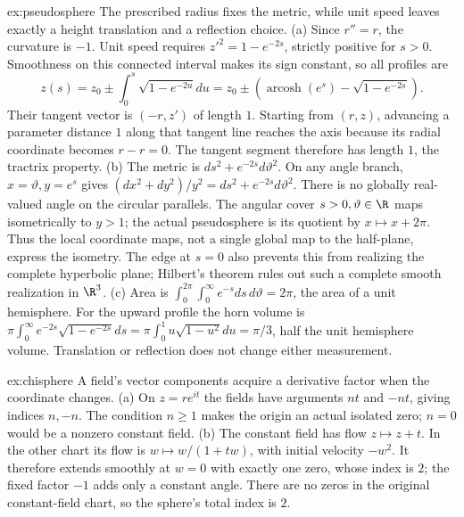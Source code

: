 \begin{solution}{ex:pseudosphere}
\idea The prescribed radius fixes the metric, while unit speed leaves exactly a height translation and a reflection choice.
\writeup (a) Since $r''=r$, the curvature is $-1$. Unit speed requires $z'^2=1-e^{-2s}$, strictly positive for $s>0$. Smoothness on this connected interval makes its sign constant, so all profiles are
\[
z(s)=z_0\pm\int_0^s\sqrt{1-e^{-2u}}du
=z_0\pm\left(\operatorname{arcosh}(e^s)-\sqrt{1-e^{-2s}}\right).
\]
Their tangent vector is $(-r,z')$ of length $1$. Starting from $(r,z)$, advancing a parameter distance $1$ along that tangent line reaches the axis because its radial coordinate becomes $r-r=0$. The tangent segment therefore has length $1$, the tractrix property.
(b) The metric is $ds^2+e^{-2s}d\vartheta^2$. On any angle branch, $x=\vartheta,y=e^s$ gives $(dx^2+dy^2)/y^2=ds^2+e^{-2s}d\vartheta^2$. There is no globally real-valued angle on the circular parallels. The angular cover $s>0,\vartheta\in\R$ maps isometrically to $y>1$; the actual pseudosphere is its quotient by $x\mapsto x+2\pi$. Thus the local coordinate maps, not a single global map to the half-plane, express the isometry. The edge at $s=0$ also prevents this from realizing the complete hyperbolic plane; Hilbert's theorem rules out such a complete smooth realization in $\R^3$.
(c) Area is $\int_0^{2\pi}\int_0^\infty e^{-s}ds\,d\vartheta=2\pi$, the area of a unit hemisphere. For the upward profile the horn volume is
$\pi\int_0^\infty e^{-2s}\sqrt{1-e^{-2s}}ds
=\pi\int_0^1u\sqrt{1-u^2}du=\pi/3$,
half the unit hemisphere volume. Translation or reflection does not change either measurement.
\end{solution}

\begin{solution}{ex:chisphere}
\idea A field's vector components acquire a derivative factor when the coordinate changes.
\writeup (a) On $z=re^{it}$ the fields have arguments $nt$ and $-nt$, giving indices $n,-n$. The condition $n\ge1$ makes the origin an actual isolated zero; $n=0$ would be a nonzero constant field.
(b) The constant field has flow $z\mapsto z+t$. In the other chart its flow is $w\mapsto w/(1+tw)$, with initial velocity $-w^2$. It therefore extends smoothly at $w=0$ with exactly one zero, whose index is $2$; the fixed factor $-1$ adds only a constant angle. There are no zeros in the original constant-field chart, so the sphere's total index is $2$.
\end{solution}

